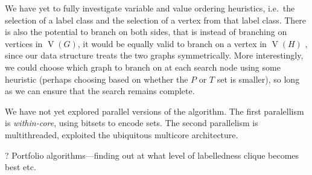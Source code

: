 \documentclass[letterpaper]{article}
\DeclareMathOperator{\V}{V}
\begin{document}
We have yet to fully investigate variable and value ordering heuristics, i.e.\ the selection of a label class and the selection of a vertex from that label class.
There is also the potential to branch on both sides, that is instead of branching on vertices in $\V(G)$, it would be equally valid to branch on
a vertex in $\V(H)$ , since our data structure treats the
two graphs symmetrically. More interestingly, we could choose which graph to branch on
at each search node using some heuristic (perhaps choosing based on whether the $P$ or
$T$ set is smaller), so long as we can ensure that the search remains complete.

We have not yet explored parallel versions of the algorithm. The first paralellism is \emph{within-core}, using bitsets to encode sets. The second parallelism  is  multithreaded,
exploited the ubiquitous multicore architecture.

? Portfolio algorithms---finding out at what level of labelledness clique becomes best etc.




\end{document}
